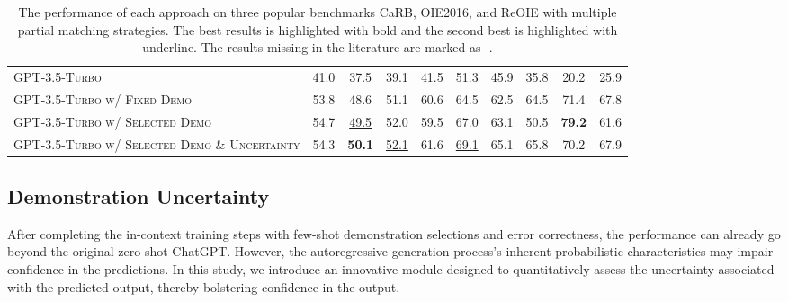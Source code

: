 \documentclass{article}
\begin{document}
\begin{table*}[t]
{\begin{tabular}{@{}lccccccccc@{}}
\midrule
\textsc{GPT-3.5-Turbo}                                 & 41.0   & 37.5   & 39.1  & 41.5    & 51.3   & 45.9   & 35.8          & 20.2          & 25.9          \\
\textsc{GPT-3.5-Turbo w/ Fixed Demo}                   & 53.8   & 48.6   & 51.1   & 60.6    & 64.5   & 62.5   & 64.5          & 71.4          & 67.8          \\
\textsc{GPT-3.5-Turbo w/ Selected Demo}                & 54.7   & \underline{49.5}   & 52.0   & 59.5    & 67.0   & 63.1   & 50.5          & \textbf{79.2} & 61.6          \\
\textsc{GPT-3.5-Turbo w/ Selected Demo \& Uncertainty} & 54.3   & \textbf{50.1}   & \underline{52.1}   & 61.6    & \underline{69.1}   & 65.1   &       65.8        &       70.2        &         67.9      \\ \bottomrule
\end{tabular}}\vspace{-3mm}
\caption{The performance of each approach on three popular benchmarks CaRB, OIE2016, and ReOIE with multiple partial matching strategies. The best results is highlighted with bold and the second best is highlighted with underline. The results missing in the literature are marked as -.}
\vspace{-3mm}
\label{tab:my-table}
\end{table*}

\subsection{Demonstration Uncertainty}\label{sec:demo}
After completing the in-context training steps with few-shot demonstration selections and error correctness, the performance can already go beyond the original zero-shot ChatGPT. However, the autoregressive generation process's inherent probabilistic characteristics may impair confidence in the predictions. In this study, we introduce an innovative module designed to quantitatively assess the uncertainty associated with the predicted output, thereby bolstering confidence in the  output.
\end{document}
